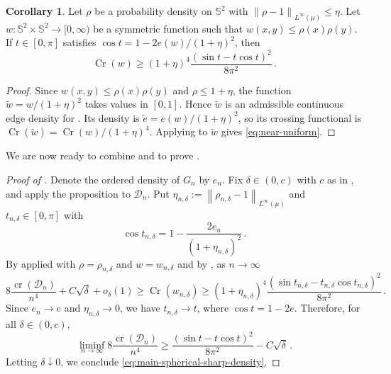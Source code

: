 \documentclass[reqno, 11pt]{amsart}
\theoremstyle{definition}
\newtheorem{corollary}{Corollary}
\newcommand{\norm}[1]{\left\lVert#1\right\rVert}
\begin{document}
\begin{corollary}\label{cor:near-uniform}
Let \(\rho\) be a probability density on \({\mathbb S}^2\) with $\norm{\rho-1}_{L^\infty(\mu)}\le\eta$. Let \(w:{\mathbb S}^2\times{\mathbb S}^2\to[0,\infty)\) be a symmetric function such that $w(x,y)\leq \rho(x)\rho(y)$. If $t \in [0,\pi]$ satisfies $\cos t = 1-2e(w) / (1+\eta)^2$, then 
\begin{equation}\label{eq:near-uniform}
    \operatorname{Cr}( w) \geq (1+\eta)^4\frac{(\sin t- t\cos t)^2}{8\pi^2}\,.
\end{equation}
\end{corollary}

\begin{proof}
Since \(w(x,y)\le \rho(x)\rho(y)\) and \(\rho\le1+\eta\), the function $\tilde w = w / (1+\eta)^2$ takes values in \([0,1]\).  Hence \(\tilde w\) is an admissible continuous edge density for .  Its density is $\tilde e = e(w)/(1+\eta)^2$, so its crossing functional is $\operatorname{Cr}(\tilde w) = \operatorname{Cr}(w) / (1+\eta)^4$.  Applying  to \(\tilde w\) gives \eqref{eq:near-uniform}.  
\end{proof}


We are now ready to combine  and  to prove .


\begin{proof}[Proof of ]
Denote the ordered density of $G_n$ by $e_n$. Fix $\delta \in (0,c)$ with $c$ as in , and apply the proposition to ${\mathcal D}_n$.  Put $\eta_{n,\delta}:= \norm{\rho_{n,\delta}-1}_{L^\infty(\mu)}$ and  $t_{n,\delta}\in[0,\pi]$ with
\begin{equation*}
        \cos t_{n,\delta}=1-\frac{2e_n}{(1+\eta_{n,\delta})^2}\,.
\end{equation*}
By  applied with $\rho=\rho_{n,\delta}$ and $w=w_{n,\delta}$ and by , as $n \to \infty$
\begin{equation}\label{eq:main-spherical-proof-lower-continuous}
        8\frac{\operatorname{cr}({\mathcal D}_n)}{n^4}
        +C\sqrt{\delta}+o_\delta(1) \geq \operatorname{Cr}(w_{n,\delta})\ge
        (1+\eta_{n,\delta})^4
        \frac{(\sin t_{n,\delta}-t_{n,\delta}\cos t_{n,\delta})^2}{8\pi^2}\,.
\end{equation}
Since $e_n\to e$ and $\eta_{n,\delta}\to0$, we have $t_{n,\delta}\to t$, where $\cos t=1-2e$.  Therefore, for all $\delta\in(0,c)$,
\begin{equation*}
        \liminf_{n\to\infty}
        8\frac{\operatorname{cr}({\mathcal D}_n)}{n^4}
        \ge
        \frac{(\sin t-t\cos t)^2}{8\pi^2}
        -C\sqrt{\delta}\,.
\end{equation*}
Letting $\delta\downarrow0$, we conclude \eqref{eq:main-spherical-sharp-density}.
\end{proof}







\end{document}
